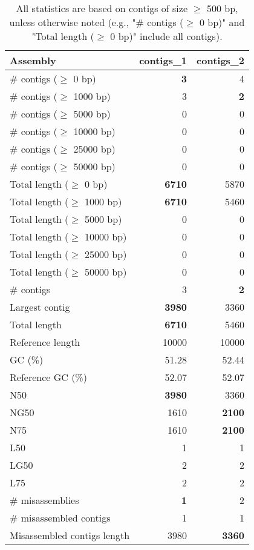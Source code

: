 \documentclass[12pt,a4paper]{article}
\begin{document}
\begin{table}[ht]
\begin{center}
\caption{All statistics are based on contigs of size $\geq$ 500 bp, unless otherwise noted (e.g., "\# contigs ($\geq$ 0 bp)" and "Total length ($\geq$ 0 bp)" include all contigs).}
\begin{tabular}{|l*{2}{|r}|}
\hline
Assembly & contigs\_1 & contigs\_2 \\ \hline
\# contigs ($\geq$ 0 bp) & {\bf 3} & 4 \\ \hline
\# contigs ($\geq$ 1000 bp) & 3 & {\bf 2} \\ \hline
\# contigs ($\geq$ 5000 bp) & 0 & 0 \\ \hline
\# contigs ($\geq$ 10000 bp) & 0 & 0 \\ \hline
\# contigs ($\geq$ 25000 bp) & 0 & 0 \\ \hline
\# contigs ($\geq$ 50000 bp) & 0 & 0 \\ \hline
Total length ($\geq$ 0 bp) & {\bf 6710} & 5870 \\ \hline
Total length ($\geq$ 1000 bp) & {\bf 6710} & 5460 \\ \hline
Total length ($\geq$ 5000 bp) & 0 & 0 \\ \hline
Total length ($\geq$ 10000 bp) & 0 & 0 \\ \hline
Total length ($\geq$ 25000 bp) & 0 & 0 \\ \hline
Total length ($\geq$ 50000 bp) & 0 & 0 \\ \hline
\# contigs & 3 & {\bf 2} \\ \hline
Largest contig & {\bf 3980} & 3360 \\ \hline
Total length & {\bf 6710} & 5460 \\ \hline
Reference length & 10000 & 10000 \\ \hline
GC (\%) & 51.28 & 52.44 \\ \hline
Reference GC (\%) & 52.07 & 52.07 \\ \hline
N50 & {\bf 3980} & 3360 \\ \hline
NG50 & 1610 & {\bf 2100} \\ \hline
N75 & 1610 & {\bf 2100} \\ \hline
L50 & 1 & 1 \\ \hline
LG50 & 2 & 2 \\ \hline
L75 & 2 & 2 \\ \hline
\# misassemblies & {\bf 1} & 2 \\ \hline
\# misassembled contigs & 1 & 1 \\ \hline
Misassembled contigs length & 3980 & {\bf 3360} \\ \hline

\end{tabular}
\end{center}
\end{table}
\end{document}

